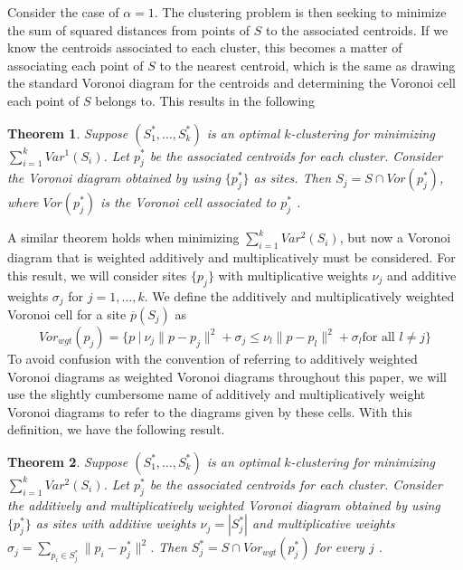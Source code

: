 \documentclass[a4paper, 11pt]{article}
\newtheorem{theorem}{Theorem}[section]
\begin{document}
Consider the case of $\alpha = 1$. The clustering problem is then seeking to minimize the sum of squared distances from points of $S$ to the
associated centroids. If we know the centroids associated to each cluster, this becomes a matter of associating each point of $S$ to the nearest
centroid, which is the same as drawing the standard Voronoi diagram for the centroids and determining the Voronoi cell each point of $S$ belongs to.
This results in the following

\begin{theorem}
  \label{thm:var_1}
  Suppose $(S_1^\ast, \dots, S_k^\ast)$ is an optimal $k$-clustering for minimizing $\sum_{i=1}^k Var^1(S_i)$. Let $p_j^\ast$ be the associated
  centroids for each cluster. Consider the Voronoi diagram obtained by using $\{ p_j^\ast \}$ as sites. Then $S_j = S \cap Vor(p_j^\ast)$, where
  $Vor(p_j^\ast)$ is the Voronoi cell associated to $p_j^\ast$ \cite{inaba_clustering} .
\end{theorem}

A similar theorem holds when minimizing $\sum_{i=1}^k Var^2(S_i)$, but now a Voronoi diagram that is weighted additively and multiplicatively must be
considered. For this result, we will consider sites $\{ p_j \}$ with multiplicative weights $\nu_j$ and additive
weights $\sigma_j$ for $j=1,\dots, k$. We define the additively and multiplicatively weighted Voronoi cell for a site $\overline{p}(S_j)$ as
\begin{equation}
  Vor_{wgt}( p_j ) = \{ p \ | \ \nu_j \| p - p_j \|^2 + \sigma_j \leq \nu_l \| p - p_l \|^2 + \sigma_l \text{
    for all $l \neq j$} \}
  \label{def:wgt_vor}
\end{equation}
To avoid confusion with the convention of referring to additively weighted Voronoi diagrams as weighted Voronoi diagrams throughout this paper, we
will use the slightly cumbersome name of additively and multiplicatively weight Voronoi diagrams to refer to the diagrams given by these cells. With
this definition, we have the following result.

\begin{theorem}
  \label{thm:var_2}
  Suppose $(S_1^\ast, \dots, S_k^\ast)$ is an optimal $k$-clustering for minimizing $\sum_{i=1}^k Var^2(S_i)$. Let $p_j^\ast$ be the associated
  centroids for each cluster. Consider the additively and multiplicatively weighted Voronoi diagram obtained by using $\{ p_j^\ast \}$ as sites with
  additive weights $\nu_j = |S_j^\ast|$ and multiplicative weights $\sigma_j = \sum_{p_i \in S_j^\ast} \| p_i - p_j^\ast \|^2$. Then $S_j^\ast =
  S \cap Vor_{wgt}(p_j^\ast)$ for every $j$ \cite{inaba_clustering}.
\end{theorem}
\end{document}
